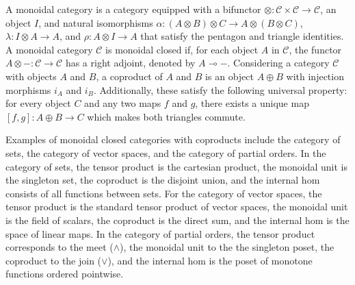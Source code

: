 \documentclass[10pt,a4paper]{amsart}
\theoremstyle{definition}
\theoremstyle{definition}
\theoremstyle{definition}
\theoremstyle{definition}
\theoremstyle{definition}
\theoremstyle{definition}
\begin{document}
A monoidal category is a category equipped with a bifunctor $\otimes: \mathcal{C} \times \mathcal{C} \xrightarrow{} \mathcal{C}$, an object $I$, and natural isomorphisms $\alpha: (A \otimes B) \otimes C \xrightarrow{} A \otimes (B \otimes C)$, $\lambda: I \otimes A \xrightarrow{} A$, and $\rho: A \otimes I \xrightarrow{} A$ that satisfy the pentagon and triangle identities. A monoidal category $\mathcal{C}$ is monoidal closed if, for each object $A$ in $\mathcal{C}$, the functor $A \otimes - : \mathcal{C} \to \mathcal{C}$ has a right adjoint, denoted by $A \multimap -$. %
Considering a category $\mathcal{C}$  with objects $A$ and $B$, a coproduct of $A$ and $B$ is an object $A \oplus B$ with injection morphisms $i_A$ and $i_B$. Additionally, these satisfy the following universal property: for every object $C$ and any two maps $f $ and $g$, there exists a unique map $[f,g] : A \oplus B \rightarrow C$ which makes both triangles commute.


Examples of monoidal closed categories with coproducts include the category of sets, the category of vector spaces, and the category of partial orders. In the category of sets, the tensor product is the cartesian product, the monoidal unit is the singleton set, the coproduct is the disjoint union, and the internal hom consists of all functions between sets. For the category of vector spaces, the tensor product is the standard tensor product of vector spaces, the monoidal unit is the field of scalars, the coproduct is the direct sum, and the internal hom is the space of linear maps. In the category of partial orders, the tensor product corresponds to the meet ($\wedge$), the monoidal unit to the the singleton poset, the coproduct to the join ($\vee$), and the internal hom is the poset of monotone functions ordered pointwise.
\end{document}
